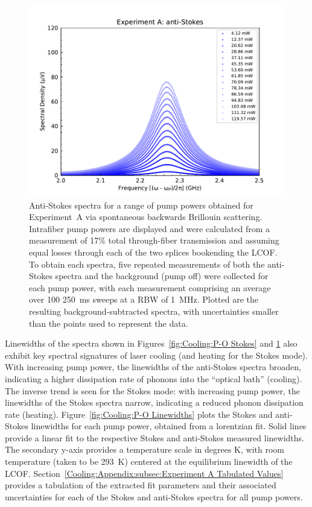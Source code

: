 \begin{figure}[t!]
  \centering
  \includegraphics[width=\textwidth]{figs/3-Cooling/P-O anti-Stokes.pdf}
  \caption{Anti-Stokes spectra for a range of pump powers obtained for Experiment~A via spontaneous backwards Brillouin scattering. Intrafiber pump powers are displayed and were calculated from a measurement of 17\% total through-fiber transmission and assuming equal losses through each of the two splices bookending the \ac{LCOF}. To obtain each spectra, five repeated measurements of both the anti-Stokes spectra and the background (pump off) were collected for each pump power, with each measurement comprising an average over 100 \SI{250}{\milli\second} sweeps at a \ac{RBW} of \SI{1}{\mega\hertz}. Plotted are the resulting background-subtracted spectra, with uncertainties smaller than the points used to represent the data.}
  \label{fig:Cooling:P-O anti-Stokes}
\end{figure}

Linewidths of the spectra shown in Figures~\ref{fig:Cooling:P-O Stokes} and \ref{fig:Cooling:P-O anti-Stokes} also exhibit key spectral signatures of laser cooling (and heating for the Stokes mode). With increasing pump power, the linewidths of the anti-Stokes spectra broaden, indicating a higher dissipation rate of phonons into the “optical bath” (cooling). The inverse trend is seen for the Stokes mode: with increasing pump power, the linewidths of the Stokes spectra narrow, indicating a reduced phonon dissipation rate (heating). Figure~\ref{fig:Cooling:P-O Linewidths} plots the Stokes and anti-Stokes linewidths for each pump power, obtained from a lorentzian fit. Solid lines provide a linear fit to the respective Stokes and anti-Stokes measured linewidths. The secondary y-axis provides a temperature scale in degrees \si{\kelvin}, with room temperature (taken to be \SI{293}{\kelvin}) centered at the equilibrium linewidth of the \ac{LCOF}. Section~\ref{Cooling:Appendix:subsec:Experiment A Tabulated Values} provides a tabulation of the extracted fit parameters and their associated uncertainties for each of the Stokes and anti-Stokes spectra for all pump powers.

